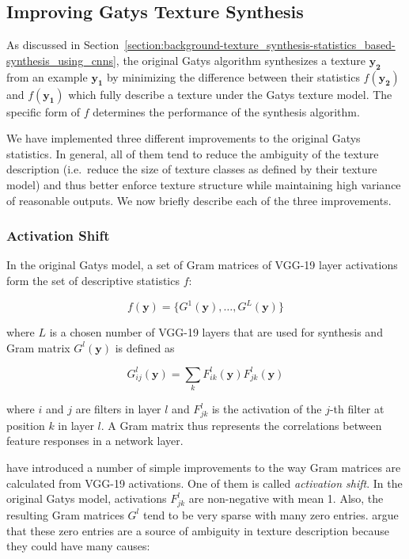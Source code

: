 \subsection{Improving Gatys Texture Synthesis}
\label{section:methods-texture_model-improvements}

As discussed in Section~\ref{section:background-texture_synthesis-statistics_based-synthesis_using_cnns}, the original Gatys algorithm synthesizes a texture \(\bm{y_2}\) from an example \(\bm{y_1}\) by minimizing the difference between their statistics \(f(\bm{y_2})\) and \(f(\bm{y_1})\) which fully describe a texture under the Gatys texture model. The specific form of \(f\) determines the performance of the synthesis algorithm.

We have implemented three different improvements to the original Gatys statistics. In general, all of them tend to reduce the ambiguity of the texture description (i.e.~reduce the size of texture classes as defined by their texture model) and thus better enforce texture structure while maintaining high variance of reasonable outputs. We now briefly describe each of the three improvements.

\subsubsection{Activation Shift}
\label{section:methods-texture_model-improvements-activation_shift}

In the original Gatys model, a set of Gram matrices of VGG-19 layer activations form the set of descriptive statistics \(f\):

\begin{equation}
    \label{eq:gatys_statistics}
    f(\bm{y}) = \{G^1(\bm{y}), \dots, G^L(\bm{y})\}
\end{equation}

where \(L\) is a chosen number of VGG-19 layers that are used for synthesis and Gram matrix \(G^l(\bm{y})\) is defined as

\begin{equation}
    \label{eq:gram_style}
    G_{ij}^l(\bm{y}) = \sum_k F_{ik}^l(\bm{y}) F_{jk}^l(\bm{y})
\end{equation}

where \(i\) and \(j\) are filters in layer \(l\) and \(F_{jk}^l\) is the activation of the \(j\)-th filter at position \(k\) in layer \(l\). A Gram matrix thus represents the correlations between feature responses in a network layer.

\citet{Novak2016} have introduced a number of simple improvements to the way Gram matrices are calculated from VGG-19 activations. One of them is called \textit{activation shift}. In the original Gatys model, activations \(F_{jk}^l\) are non-negative with mean 1. Also, the resulting Gram matrices \(G^l\) tend to be very sparse with many zero entries. \citet{Novak2016} argue that these zero entries are a source of ambiguity in texture description because they could have many causes:

